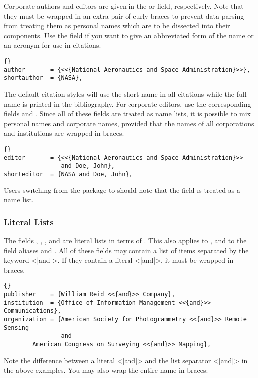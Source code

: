 \documentclass{ltxdockit}[2011/03/25]
\begin{document}
Corporate authors and editors are given in the  or  field, respectively. Note that they must be wrapped in an extra pair of curly braces to prevent data parsing from treating them as personal names which are to be dissected into their components. Use the  field if you want to give an abbreviated form of the name or an acronym for use in citations.

\begin{lstlisting}[style=bibtex]{}
author       = {<<{National Aeronautics and Space Administration}>>},
shortauthor  = {NASA},
\end{lstlisting}
%
The default citation styles will use the short name in all citations while the full name is printed in the bibliography. For corporate editors, use the corresponding fields  and . Since all of these fields are treated as name lists, it is possible to mix personal names and corporate names, provided that the names of all corporations and institutions are wrapped in braces.

\begin{lstlisting}[style=bibtex]{}
editor       = {<<{National Aeronautics and Space Administration}>>
                and Doe, John},
shorteditor  = {NASA and Doe, John},
\end{lstlisting}
%
Users switching from the  package to  should note that the  field is treated as a name list.

\subsubsection{Literal Lists}
\label{bib:use:and}

The fields , , , and  are literal lists in terms of . This also applies to ,  and to the field aliases  and . All of these fields may contain a list of items separated by the keyword <|and|>. If they contain a literal <|and|>, it must be wrapped in braces.

\begin{lstlisting}[style=bibtex]{}
publisher    = {William Reid <<{and}>> Company},
institution  = {Office of Information Management <<{and}>> Communications},
organization = {American Society for Photogrammetry <<{and}>> Remote Sensing
                and
		American Congress on Surveying <<{and}>> Mapping},
\end{lstlisting}
%
Note the difference between a literal <|{and}|> and the list separator <|and|> in the above examples. You may also wrap the entire name in braces:
\end{document}
